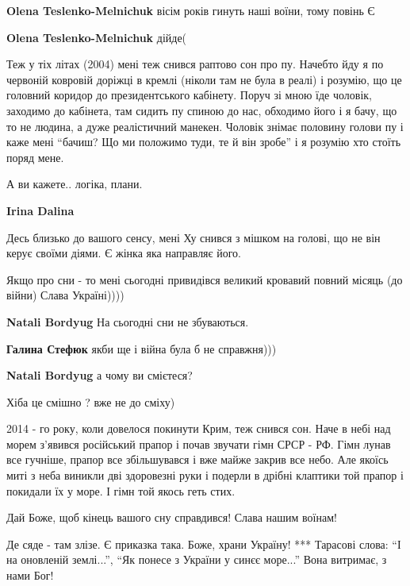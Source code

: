\begin{itemize}
\begin{itemize} %
\textbf{Olena Teslenko-Melnichuk} вісім років гинуть наші воїни, тому повінь Є

\textbf{Olena Teslenko-Melnichuk} дійде(
\end{itemize} %


Теж у тіх літах (2004) мені теж снився раптово сон про пу. Начебто йду я по
червоній ковровій доріжці в кремлі (ніколи там не була в реалі) і розумію, що
це головний коридор до президентського кабінету. Поруч зі мною їде чоловік,
заходимо до кабінета, там сидить пу спиною до нас, обходимо його і я бачу, що
то не людина, а дуже реалістичний манекен. Чоловік знімає половину голови пу і
каже мені \enquote{бачиш? Що ми положимо туди, те й він зробе} і я розумію хто стоїть
поряд мене.

А ви кажете.. логіка, плани.

\textbf{Irina Dalina} 

Десь близько до вашого сенсу, мені Ху снився з мішком на голові, що не він
керує своїми діями. Є жінка яка направляє його.


Якщо про сни - то мені сьогодні привидівся великий кровавий повний місяць (до війни)
Слава Україні))))

\begin{itemize} %
\textbf{Natali Bordyug} На сьогодні сни не збуваються.

\textbf{Галина Стефюк} якби ще і війна була б не справжня)))

\textbf{Natali Bordyug} а чому ви смієтеся?

Хіба це смішно ? вже не до сміху)
\end{itemize} %


2014 - го року, коли довелося покинути Крим, теж снився сон. Наче в небі над
морем з'явився російський прапор і почав звучати гімн СРСР - РФ. Гімн лунав все
гучніше, прапор все збільшувався і вже майже закрив все небо. Але якоїсь миті з
неба виникли дві здоровезні руки і подерли в дрібні клаптики той прапор і
покидали їх у море. І гімн той якось геть стих.

Дай Боже, щоб кінець вашого сну справдився! Слава нашим воїнам!

Де сяде - там злізе. Є приказка така.
Боже, храни Україну!
***
Тарасові слова: \enquote{І на оновленій землі...}, \enquote{Як понесе з України
у синєє море...} Вона витримає, з нами Бог!


\end{itemize} %
